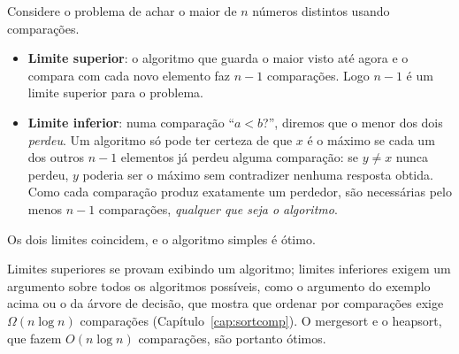 \begin{exemplo}\label{ex:maximo}
Considere o problema de achar o maior de $n$ números distintos usando comparações.
\begin{itemize}
  \item \textbf{Limite superior}: o algoritmo que guarda o maior visto até agora e o compara com cada novo elemento faz $n-1$ comparações. Logo $n-1$ é um limite superior para o problema.
  \item \textbf{Limite inferior}: numa comparação ``$a<b$?'', diremos que o menor dos dois \emph{perdeu}. Um algoritmo só pode ter certeza de que $x$ é o máximo se cada um dos outros $n-1$ elementos já perdeu alguma comparação: se $y\ne x$ nunca perdeu, $y$ poderia ser o máximo sem contradizer nenhuma resposta obtida. Como cada comparação produz exatamente um perdedor, são necessárias pelo menos $n-1$ comparações, \emph{qualquer que seja o algoritmo}.
\end{itemize}
Os dois limites coincidem, e o algoritmo simples é ótimo.
\end{exemplo}

Limites superiores se provam exibindo um algoritmo; limites inferiores exigem um argumento sobre todos os algoritmos possíveis, como o argumento do exemplo acima ou o da árvore de decisão, que mostra que ordenar por comparações exige $\Omega(n\log n)$ comparações (Capítulo~\ref{cap:sortcomp}). O mergesort e o heapsort, que fazem $O(n\log n)$ comparações, são portanto ótimos.

